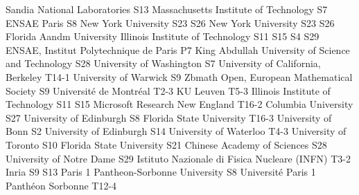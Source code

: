 \begin{multicols}{2}
{Sandia National Laboratories}
{S13}
{}
{}
{}
{}
{}
{}
{Massachusetts Institute of Technology}
{S7}
{}
{}
{}
{}
{}
{}
{ENSAE Paris}
{S8}
{}
{}
{}
{}
{}
{}
{New York University}
{S23}
{S26}
{}
{}
{}
{}
{}
{New York University}
{S23}
{S26}
{}
{}
{}
{}
{}
{Florida Aandm University}
{}
{}
{}
{}
{}
{}
{}
{Illinois Institute of Technology}
{S11}
{S15}
{S4}
{S29}
{}
{}
{}
{ENSAE, Institut Polytechnique de Paris}
{P7}
{}
{}
{}
{}
{}
{}
{King Abdullah University of Science and Technology}
{S28}
{}
{}
{}
{}
{}
{}
{University of Washington}
{S7}
{}
{}
{}
{}
{}
{}
{University of California, Berkeley}
{T14-1}
{}
{}
{}
{}
{}
{}
{University of Warwick}
{S9}
{}
{}
{}
{}
{}
{}
{Zbmath Open, European Mathematical Society}
{S9}
{}
{}
{}
{}
{}
{}
{Universit\'e de Montr\'eal}
{T2-3}
{}
{}
{}
{}
{}
{}
{KU Leuven}
{T5-3}
{}
{}
{}
{}
{}
{}
{Illinois Institute of Technology}
{S11}
{S15}
{}
{}
{}
{}
{}
{Microsoft Research New England}
{T16-2}
{}
{}
{}
{}
{}
{}
{Columbia University}
{S27}
{}
{}
{}
{}
{}
{}
{University of Edinburgh}
{S8}
{}
{}
{}
{}
{}
{}
{Florida State University}
{T16-3}
{}
{}
{}
{}
{}
{}
{University of Bonn}
{S2}
{}
{}
{}
{}
{}
{}
{University of Edinburgh}
{S14}
{}
{}
{}
{}
{}
{}
{University of Waterloo}
{T4-3}
{}
{}
{}
{}
{}
{}
{University of Toronto}
{S10}
{}
{}
{}
{}
{}
{}
{Florida State University}
{S21}
{}
{}
{}
{}
{}
{}
{Chinese Academy of Sciences}
{S28}
{}
{}
{}
{}
{}
{}
{University of Notre Dame}
{S29}
{}
{}
{}
{}
{}
{}
{Istituto Nazionale di Fisica Nucleare (INFN)}
{T3-2}
{}
{}
{}
{}
{}
{}
{Inria}
{S9}
{S13}
{}
{}
{}
{}
{}
{Paris 1 Pantheon-Sorbonne University}
{S8}
{}
{}
{}
{}
{}
{}
{Universit\'e Paris 1 Panth\'eon Sorbonne}
{T12-4}

\end{multicols}
